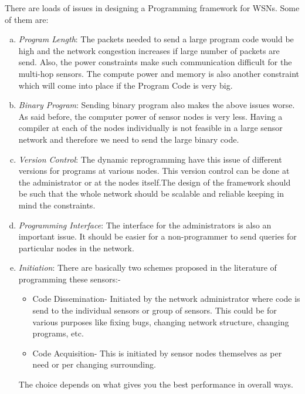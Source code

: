 \documentclass[twocolumn]{article}
\begin{document}
There are loads of issues in designing a Programming framework for WSNs. Some of them are:
\begin{enumerate}[a)]
\item \emph{Program Length}: The packets needed to send a large program code would be high and the network congestion increases if large number of packets are send. Also, the power constraints make such communication difficult for the multi-hop sensors. The compute power and memory is also another constraint which will come into place if the Program Code is very big.

\item \emph{Binary Program}: Sending binary program also makes the above issues worse. As said before, the computer power of sensor nodes is very less. Having a compiler at each of the nodes individually is not feasible in a large sensor network and therefore we need to send the large binary code.

\item \emph{Version Control}: The dynamic reprogramming have this issue of different versions for programs at various nodes. This version control can be done at the administrator or at the nodes itself.The design of the framework should be such that the whole network should be scalable and reliable keeping in mind the constraints.

\item \emph{Programming Interface}: The interface for the administrators is also an important issue. It should be easier for a non-programmer to send queries for particular nodes in the network.

\item \emph{Initiation}: There are basically two schemes proposed in the literature of programming these sensors\cite{Wang06reprogrammingwireless}:-
\begin{itemize}
\item Code Dissemination- Initiated by the network administrator where code is send to the individual sensors or group of sensors. This could be for various purposes like fixing bugs, changing network structure, changing programs, etc.

\item Code Acquisition- This is initiated by sensor nodes themselves as per need or per changing surrounding.
\end{itemize}

The choice depends on what gives you the best performance in overall ways.
\end{enumerate}
\end{document}
